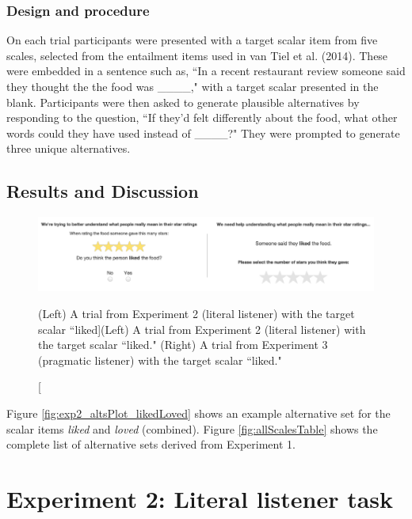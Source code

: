 \documentclass[10pt, letterpaper]{article}
\newenvironment{CodeChunk}{}{}
\begin{document}
\subsubsection{Design and procedure}\label{design-and-procedure}

On each trial participants were presented with a target scalar item from
five scales, selected from the entailment items used in {van Tiel} et
al. (2014). These were embedded in a sentence such as, ``In a recent
restaurant review someone said they thought the the food was \_\_\_\_,"
with a target scalar presented in the blank. Participants were then
asked to generate plausible alternatives by responding to the question,
``If they'd felt differently about the food, what other words could they
have used instead of \_\_\_\_?" They were prompted to generate three
unique alternatives.

\subsection{Results and Discussion}\label{results-and-discussion}

\begin{CodeChunk}
\begin{figure}[t]

{\centering \includegraphics{figs/stimuli_exp1-1} 

}

\caption[(Left) A trial from Experiment 2 (literal listener) with the target scalar ``liked]{(Left) A trial from Experiment 2 (literal listener) with the target scalar ``liked." (Right) A trial from Experiment 3 (pragmatic listener) with the target scalar ``liked."}\label{fig:stimuli_exp1}
\end{figure}
\end{CodeChunk}

Figure \ref{fig:exp2_altsPlot_likedLoved} shows an example alternative
set for the scalar items \emph{liked} and \emph{loved} (combined).
Figure \ref{fig:allScalesTable} shows the complete list of alternative
sets derived from Experiment 1.

\section{Experiment 2: Literal listener
task}\label{experiment-2-literal-listener-task}
\end{document}
